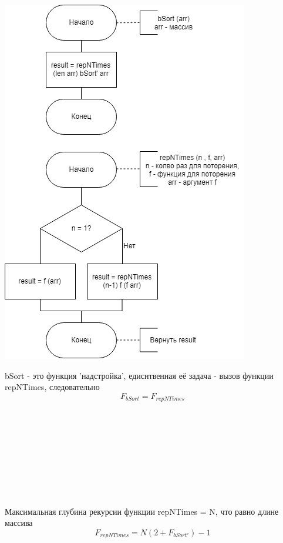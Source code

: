 \documentclass[12pt]{report}
\begin{document}
\begin{minipage}{0.5\textwidth}
  \begin{flushleft}
	\includegraphics[scale=0.6]{bSort.png}
  \end{flushleft}
\end{minipage}
\hfill
\begin{minipage}{0.5\textwidth}
  \begin{flushright}
	\begin{center}
	bSort - это функция 'надстройка', едиснтвенная её задача - вызов функции repNTimes, следовательно
	\begin{equation}
	F_{bSort} = F_{repNTimes}
	\end{equation}
	~\\
	~\\
	~\\
	~\\
	~\\
	~\\
	~\\
	~\\
	~\\
	Максимальная глубина рекурсии функции repNTimes = N, что равно длине массива
	\begin{equation}
	F_{repNTimes} = N(2 + F_{bSort'}) - 1
	\end{equation}
	\end{center}
  \end{flushright}
\end{minipage}
\end{document}
